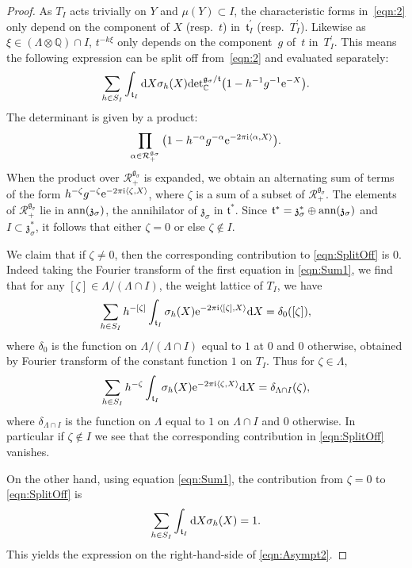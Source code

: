 \documentclass[pdftex]{sigma}
\numberwithin{equation}{section}
\newcommand{\pair}[2]{\langle #1, #2 \rangle}
\newcommand{\tn}[1]{\textnormal{#1}}
\renewcommand{\i}{{\mathrm{i}}}
\def\g{\ensuremath{\mathfrak{g}}}
\def\z{\ensuremath{\mathfrak{z}}}
\def\t{\ensuremath{\mathfrak{t}}}
\def\R{\ensuremath{\mathcal{R}}}
\def\bC{\ensuremath{\mathbb{C}}}
\def\bQ{\ensuremath{\mathbb{Q}}}
\def\ann{\ensuremath{\tn{ann}}}
\def\de{\ensuremath{\tn{det}_\bC}}
\begin{document}
\begin{proof}As $T_I$ acts trivially on $Y$ and $\mu(Y)\subset I$, the characteristic forms in~\eqref{eqn:2} only depend on the component of $X$ (resp.~$t$) in~$\t_I^\prime$ (resp.~$T_I^\prime$). Likewise as $\xi \in (\Lambda \otimes \bQ) \cap I$, $t^{-k\xi}$ only depends on the component~$g$ of~$t$ in~$T_I^\prime$. This means the following expression can be split off from~\eqref{eqn:2} and evaluated separately:
\begin{gather}\label{eqn:SplitOff}
\sum_{h \in S_I}\int_{\t_I}{\rm d} X \sigma_h(X)\de^{\g_\sigma/\t}\big(1-h^{-1}g^{-1}{\rm e}^{-X}\big).
\end{gather}
The determinant is given by a product:
\[ \prod_{\alpha \in \R_+^{\g_\sigma}} \big(1-h^{-\alpha}g^{-\alpha}{\rm e}^{-2\pi \i \pair{\alpha}{X}}\big).\]
When the product over $\R_+^{\g_\sigma}$ is expanded, we obtain an alternating sum of terms of the form $h^{-\zeta}g^{-\zeta}{\rm e}^{-2\pi \i \pair{\zeta}{X}}$, where $\zeta$ is a sum of a subset of $\R_+^{\g_\sigma}$. The elements of $\R_+^{\g_\sigma}$ lie in $\tn{ann}(\z_\sigma)$, the annihilator of $\z_\sigma$ in $\t^\ast$. Since $\t^\ast=\z_\sigma^\ast\oplus \ann(\z_\sigma)$ and $I \subset \z_\sigma^\ast$, it follows that either $\zeta=0$ or else $\zeta \notin I$.

We claim that if $\zeta \ne 0$, then the corresponding contribution to \eqref{eqn:SplitOff} is $0$. Indeed taking the Fourier transform of the first equation in \eqref{eqn:Sum1}, we find that for any $[\zeta] \in \Lambda/(\Lambda \cap I)$, the weight lattice of $T_I$, we have
\[ \sum_{h \in S_I} h^{-[\zeta]}\int_{\t_I}\sigma_h(X){\rm e}^{-2\pi \i\pair{[\zeta]}{X}}{\rm d}X=\delta_0([\zeta]),\]
where $\delta_0$ is the function on $\Lambda/(\Lambda \cap I)$ equal to $1$ at $0$ and $0$ otherwise, obtained by Fourier transform of the constant function $1$ on $T_I$. Thus for $\zeta \in \Lambda$,
\begin{gather*}
\sum_{h \in S_I} h^{-\zeta}\int_{\t_I}\sigma_h(X){\rm e}^{-2\pi \i\pair{\zeta}{X}}{\rm d} X=\delta_{\Lambda \cap I}(\zeta),
\end{gather*}
where $\delta_{\Lambda \cap I}$ is the function on $\Lambda$ equal to $1$ on $\Lambda \cap I$ and $0$ otherwise. In particular if $\zeta \notin I$ we see that the corresponding contribution in \eqref{eqn:SplitOff} vanishes.

On the other hand, using equation \eqref{eqn:Sum1}, the contribution from $\zeta=0$ to \eqref{eqn:SplitOff} is
\[ \sum_{h \in S_I}\int_{\t_I}{\rm d} X \sigma_h(X)=1. \]
This yields the expression on the right-hand-side of \eqref{eqn:Asympt2}.
\end{proof}
\end{document}
